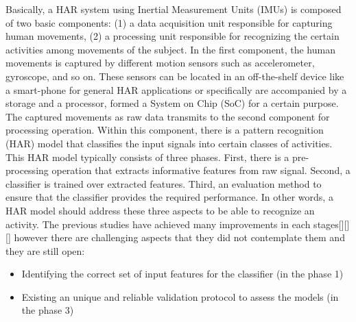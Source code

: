 \documentclass[journal,article,submit,moreauthors,pdftex]{Definitions/mdpi}
\begin{document}
Basically, a HAR system using Inertial Measurement Units (IMUs) is composed of two basic components: (1) a data acquisition unit responsible for capturing human movements, (2) a processing unit responsible for recognizing the certain activities among movements of the subject\cite{rosati2018comparison}. In the first component, the human movements is captured by different motion sensors such as accelerometer, gyroscope, and so on. These sensors can be located in an off-the-shelf device like a smart-phone for general HAR applications or specifically are accompanied by a storage and a processor, formed a System on Chip (SoC) for a certain purpose.\\
The captured movements as raw data transmits to the second component for processing operation. Within this component, there is a pattern recognition (HAR) model that classifies the input signals into certain classes of activities. This HAR model typically consists of three phases. First, there is a pre-processing operation that extracts informative features from raw signal. Second, a classifier is trained over extracted features. Third, an evaluation method to ensure that the classifier provides the required performance\cite{kolodziej2019registration}. In other words, a HAR model should address these three aspects to be able to recognize an activity. The previous studies have achieved many improvements in each stages[][][] however there are challenging aspects that they did not contemplate them and they are still open:
\begin{itemize}[leftmargin=*,labelsep=5.8mm]
	\item	Identifying the correct set of input features for the classifier\cite{rosati2018comparison} (in the phase 1)
	\item	Existing an unique and reliable validation protocol to assess the models \cite{jordao2018human}(in the phase 3)
\end{itemize} 
\end{document}
